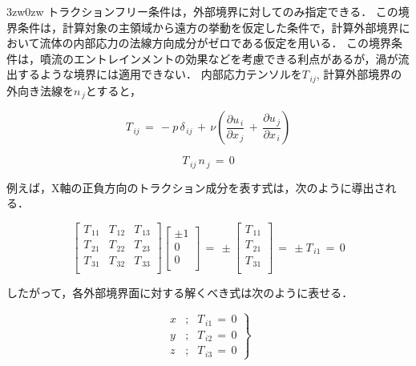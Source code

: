 \begin{indentation}{3zw}{0zw}
トラクションフリー条件は，外部境界に対してのみ指定できる．
この境界条件は，計算対象の主領域から遠方の挙動を仮定した条件で，計算外部境界において流体の内部応力の法線方向成分がゼロである仮定を用いる．
この境界条件は，噴流のエントレインメントの効果などを考慮できる利点があるが，渦が流出するような境界には適用できない．
内部応力テンソルを$T_{\,ij}$, 計算外部境界の外向き法線を$n_{\,j}$とすると，

\begin{equation}
T_{\,ij} \,=\, - p \,\delta_{\,ij} \,+\,\nu \left( \frac{\partial u_{\,i}}{\partial x_{\,j}} \,+\, \frac{\partial u_{\,j}}{\partial x_{\,i}} \right)
\label{eq:Traction}
\end{equation}

\begin{equation}
T_{\,ij}\, n_{\,j} \,=\, 0
\label{eq:Tfree}
\end{equation}

\noindent 例えば，X軸の正負方向のトラクション成分を表す式は，次のように導出される．

\begin{equation}
\left[
\begin{array}{ccc}
T_{\,11} & T_{\,12} & T_{\,13}\\
T_{\,21} & T_{\,22} & T_{\,23}\\
T_{\,31} & T_{\,32} & T_{\,33}\\
\end{array} \right] \left[
\begin{array}{c}
\pm1\\
0\\
0\\
\end{array}
\right]
\,=\,
\pm \left[ 
\begin{array}{c}
T_{\,11}\\
T_{\,21}\\
T_{\,31}\\
\end{array} \right]
\,=\, \pm T_{\,i1} \,=\, 0
\label{eq:trc_eq}
\end{equation}

\noindent したがって，各外部境界面に対する解くべき式は次のように表せる．

\begin{equation}
\left .
\begin{array}{lll}
x & ; & T_{\,i1}\,=\,0 \\
y & ; & T_{\,i2}\,=\,0 \\
z & ; & T_{\,i3}\,=\,0  
\end{array}
\right \}
\label{eq:trc_eq2}
\end{equation}


\end{indentation}
